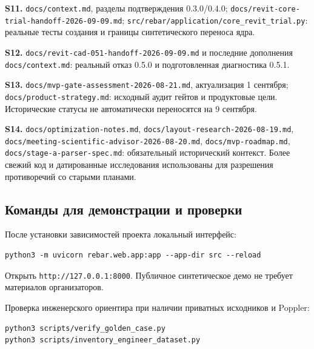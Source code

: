 \documentclass[11pt,a4paper]{article}
\begin{document}
\hypertarget{S11}{}

\textbf{S11.} {\small\nolinkurl{docs/context.md}}, разделы подтверждения 0.3.0/0.4.0; {\small\nolinkurl{docs/revit-core-trial-handoff-2026-09-09.md}}; {\small\nolinkurl{src/rebar/application/core_revit_trial.py}}: реальные тесты создания и границы синтетического переноса ядра.


\hypertarget{S12}{}

\textbf{S12.} {\small\nolinkurl{docs/revit-cad-051-handoff-2026-09-09.md}} и последние дополнения {\small\nolinkurl{docs/context.md}}: реальный отказ 0.5.0 и подготовленная диагностика 0.5.1.


\hypertarget{S13}{}

\textbf{S13.} {\small\nolinkurl{docs/mvp-gate-assessment-2026-08-21.md}}, актуализация 1 сентября; {\small\nolinkurl{docs/product-strategy.md}}: исходный аудит гейтов и продуктовые цели. Исторические статусы не автоматически переносятся на 9 сентября.


\hypertarget{S14}{}

\textbf{S14.} {\small\nolinkurl{docs/optimization-notes.md}}, {\small\nolinkurl{docs/layout-research-2026-08-19.md}}, {\small\nolinkurl{docs/meeting-scientific-advisor-2026-08-20.md}}, {\small\nolinkurl{docs/mvp-roadmap.md}}, {\small\nolinkurl{docs/stage-a-parser-spec.md}}: обязательный исторический контекст. Более свежий код и датированные исследования использованы для разрешения противоречий со старыми планами.


\subsection{Команды для демонстрации и проверки}

После установки зависимостей проекта локальный интерфейс:


\begin{Verbatim}[fontsize=\scriptsize,frame=single,rulecolor=\color{gray!30},framesep=8pt]
python3 -m uvicorn rebar.web.app:app --app-dir src --reload
\end{Verbatim}

Открыть {\small\nolinkurl{http://127.0.0.1:8000}}. Публичное синтетическое демо не требует материалов организаторов.


Проверка инженерского ориентира при наличии приватных исходников и Poppler:


\begin{Verbatim}[fontsize=\scriptsize,frame=single,rulecolor=\color{gray!30},framesep=8pt]
python3 scripts/verify_golden_case.py
python3 scripts/inventory_engineer_dataset.py
\end{Verbatim}
\end{document}
